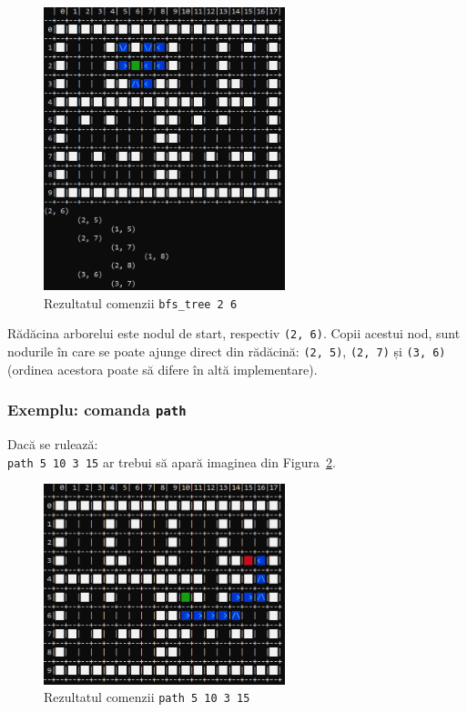 \documentclass[../ro-fa-lab.tex]{subfiles}
\begin{document}
\begin{figure}[h]
    \centering
    \includegraphics[width=7cm]{../Resources/lab9/grid_bfs_tree.png}
    \caption{Rezultatul comenzii \texttt{bfs\_tree 2 6}}
    \label{fig:bfs_tree}
\end{figure}

Rădăcina arborelui este nodul de start, respectiv \texttt{(2, 6)}. Copii acestui nod, sunt nodurile în care se poate ajunge direct din rădăcină: \texttt{(2, 5)}, \texttt{(2, 7)} și \texttt{(3, 6)} (ordinea acestora poate să difere în altă implementare).

\subsubsection{Exemplu: comanda \texttt{path}}
Dacă se rulează:\\
\texttt{path 5 10 3 15}
ar trebui să apară imaginea din Figura~\ref{fig:path}.

\begin{figure}[h]
    \centering
    \includegraphics[width=7cm]{../Resources/lab9/grid_path.png}
    \caption{Rezultatul comenzii \texttt{path 5 10 3 15}}
    \label{fig:path}
\end{figure}
\end{document}
